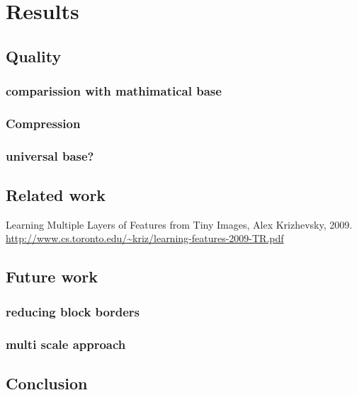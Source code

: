 \chapter{Results}

\section{Quality}
\subsection{comparission with mathimatical base}
\subsection{Compression}
\subsection{universal base?}


\section{Related work}
Learning Multiple Layers of Features from Tiny Images, Alex Krizhevsky, 2009.
\url{http://www.cs.toronto.edu/~kriz/learning-features-2009-TR.pdf}


\section{Future work}
\subsection{reducing block borders}
\subsection{multi scale approach}


\section{Conclusion}